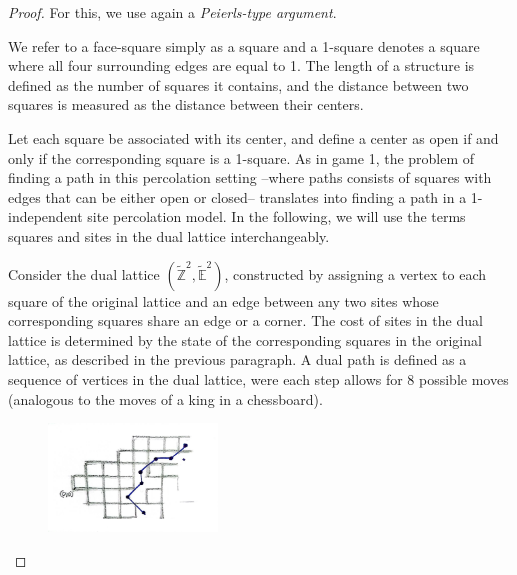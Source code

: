         \begin{proof}
            For this, we use again a \emph{Peierls-type argument}. 


            We refer to a face-square simply as a square and a 1-square denotes a square where all four surrounding edges are equal to 1. The length of a structure is defined as the number of squares it contains, and the distance between two squares is measured as the distance between their centers. 

            Let each square be associated with its center, and define a center as open if and only if the corresponding square is a 1-square. As in game 1, the problem of finding a path in this percolation setting --where paths consists of squares with edges that can be either open or closed-- translates into finding a path in a 1-independent site percolation model. In the following, we will use the terms squares and sites in the dual lattice interchangeably.

            Consider the dual lattice $(\tilde{\mathbb{Z}}^2, \tilde{\mathbb{E}}^2)$, constructed by assigning a vertex to each square of the original lattice and an edge between any two sites whose corresponding squares share an edge or a corner. The cost of sites in the dual lattice is determined by the state of the corresponding squares in the original lattice, as described in the previous paragraph. A dual path is defined as a sequence of vertices in the dual lattice, were each step allows for 8 possible moves (analogous to the moves of a king in a chessboard).

            \begin{figure}[!hbt]
            \centering
            \includegraphics[width = 0.4\textwidth]{../images/game2/pierles-type-argument.jpg}
            \end{figure}


\end{proof}
